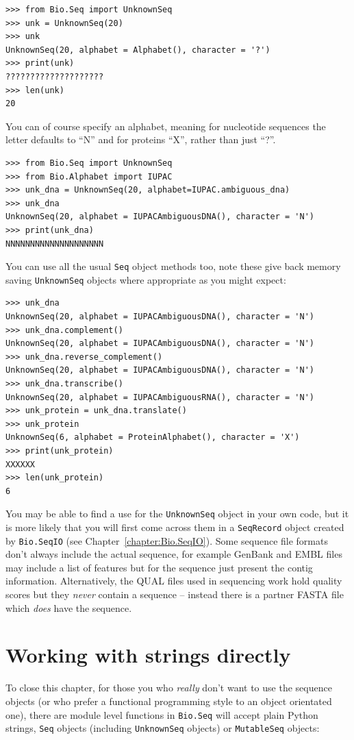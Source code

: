 \documentclass{report}
\begin{document}
\begin{verbatim}
>>> from Bio.Seq import UnknownSeq
>>> unk = UnknownSeq(20)
>>> unk
UnknownSeq(20, alphabet = Alphabet(), character = '?')
>>> print(unk)
????????????????????
>>> len(unk)
20
\end{verbatim}

You can of course specify an alphabet, meaning for nucleotide sequences
the letter defaults to ``N'' and for proteins ``X'', rather than just ``?''.

\begin{verbatim}
>>> from Bio.Seq import UnknownSeq
>>> from Bio.Alphabet import IUPAC
>>> unk_dna = UnknownSeq(20, alphabet=IUPAC.ambiguous_dna)
>>> unk_dna
UnknownSeq(20, alphabet = IUPACAmbiguousDNA(), character = 'N')
>>> print(unk_dna)
NNNNNNNNNNNNNNNNNNNN
\end{verbatim}

You can use all the usual \verb|Seq| object methods too, note these give back
memory saving \verb|UnknownSeq| objects where appropriate as you might expect:

\begin{verbatim}
>>> unk_dna
UnknownSeq(20, alphabet = IUPACAmbiguousDNA(), character = 'N')
>>> unk_dna.complement()
UnknownSeq(20, alphabet = IUPACAmbiguousDNA(), character = 'N')
>>> unk_dna.reverse_complement()
UnknownSeq(20, alphabet = IUPACAmbiguousDNA(), character = 'N')
>>> unk_dna.transcribe()
UnknownSeq(20, alphabet = IUPACAmbiguousRNA(), character = 'N')
>>> unk_protein = unk_dna.translate()
>>> unk_protein
UnknownSeq(6, alphabet = ProteinAlphabet(), character = 'X')
>>> print(unk_protein)
XXXXXX
>>> len(unk_protein)
6
\end{verbatim}

You may be able to find a use for the \verb|UnknownSeq| object in your own
code, but it is more likely that you will first come across them in a
\verb|SeqRecord| object created by \verb|Bio.SeqIO|
(see Chapter~\ref{chapter:Bio.SeqIO}).
Some sequence file formats don't always include the actual sequence, for
example GenBank and EMBL files may include a list of features but for the
sequence just present the contig information.  Alternatively, the QUAL files
used in sequencing work hold quality scores but they \emph{never} contain a
sequence -- instead there is a partner FASTA file which \emph{does} have the
sequence.

\section{Working with strings directly}
\label{sec:seq-module-functions}
To close this chapter, for those you who \emph{really} don't want to use the sequence
objects (or who prefer a functional programming style to an object orientated one),
there are module level functions in \verb|Bio.Seq| will accept plain Python strings,
\verb|Seq| objects (including \verb|UnknownSeq| objects) or \verb|MutableSeq| objects:
\end{document}
